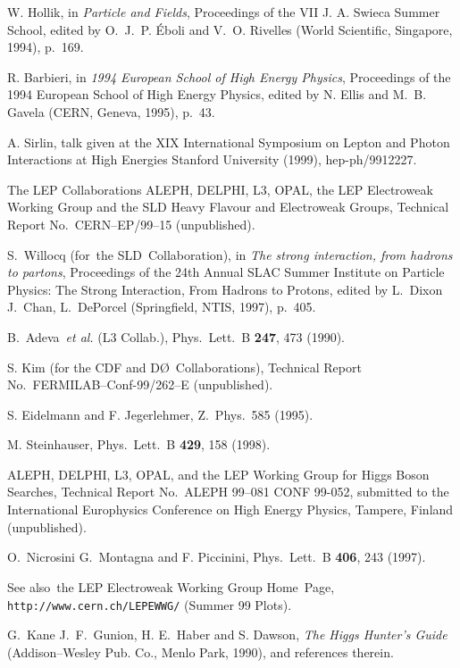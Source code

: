 \documentclass[12pt]{report}
\begin{document}
\begin{thebibliography}{100}
W. Hollik,  in {\em Particle and Fields}, Proceedings of the VII J. A. Swieca
  Summer School, edited by O.~J.~P. \'Eboli and V.~O. Rivelles (World
  Scientific, Singapore, 1994), p.\ 169.

R. Barbieri,  in {\em 1994 European School of High Energy Phys\-ics},
  Proceedings of the 1994 European School of High Energy Phys\-ics, edited by
  N. Ellis and M.~B. Gavela (CERN, Geneva, 1995), p.\ 43.

A. Sirlin, talk given at the XIX International Symposium on Lepton and Photon
  Interactions at High Energies  Stanford University  (1999), hep-ph/9912227.

{The LEP Collaborations ALEPH, DELPHI, L3, OPAL, the LEP Electroweak Working
  Group and the SLD Heavy Flavour and Electroweak Groups}, Technical Report
  No.~CERN--EP/99--15 (unpublished).

S.~Willocq (for~the SLD~Collaboration),  in {\em The strong interaction, from
  hadrons to partons}, Proceedings of the 24th Annual SLAC Summer Institute on
  Particle Physics: The Strong Interaction, From Hadrons to Protons, edited by
  L.~Dixon J.~Chan, L.~DePorcel (Springfield, NTIS, 1997), p.\ 405.

B.~Adeva~{{\it et al.}} {(L3 Collab.)}, Phys.\ Lett.\ B {\bf 247},  473
  (1990).

{S. Kim (for the CDF and D\O\ Collaborations)}, Technical Report
  No.~FERMILAB--Conf-99/262--E (unpublished).

S. Eidelmann and F. Jegerlehmer, Z.\ Phys.\  585  (1995).

M. Steinhauser, Phys.\ Lett.\ B {\bf 429},  158  (1998).

{ALEPH, DELPHI, L3, OPAL, and the LEP Working Group for Higgs Boson Searches},
  Technical Report No.~ALEPH 99--081 CONF 99-052, submitted to the
  International Europhysics Conference on High Energy Physics, Tampere, Finland
  (unpublished).

O.~Nicrosini G.~Montagna and F. Piccinini, Phys.\ Lett.\ B {\bf 406},  243
  (1997).

See also~the LEP Electroweak Working Group Home~Page, {{\tt
  http://www.cern.ch/LEPEWWG/}} (Summer 99 Plots).

G.~Kane J.~F.~Gunion, H. E.~Haber and S. Dawson, {\em The Higgs Hunter's Guide}
  (Addison--Wesley Pub. Co., Menlo Park, 1990), and references therein.


\end{thebibliography}
\end{document}
